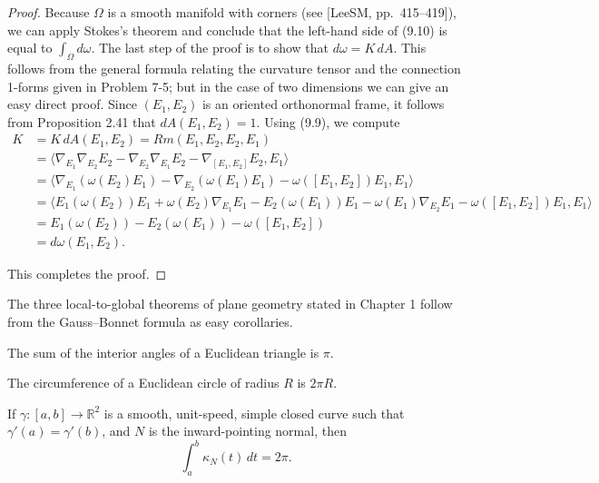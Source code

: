 \begin{proof}
Because $\Omega$ is a smooth manifold with corners (see [LeeSM, pp.~415--419]), we can apply Stokes's theorem and conclude that the left-hand side of (9.10) is equal to $\int_\Omega d\omega$. The last step of the proof is to show that $d\omega = K\, dA$. This follows from the general formula relating the curvature tensor and the connection 1-forms given in Problem 7-5; but in the case of two dimensions we can give an easy direct proof. Since $(E_1, E_2)$ is an oriented orthonormal frame, it follows from Proposition 2.41 that $dA(E_1, E_2) = 1$. Using (9.9), we compute
\begin{align*}
K &= K\, dA(E_1, E_2) = Rm(E_1, E_2, E_2, E_1) \\
&= \langle \nabla_{E_1} \nabla_{E_2} E_2 - \nabla_{E_2} \nabla_{E_1} E_2 - \nabla_{[E_1,E_2]} E_2, E_1 \rangle \\
&= \langle \nabla_{E_1} (\omega(E_2)E_1) - \nabla_{E_2} (\omega(E_1)E_1) - \omega([E_1, E_2])E_1, E_1 \rangle \\
&= \langle E_1(\omega(E_2))E_1 + \omega(E_2)\nabla_{E_1} E_1 - E_2(\omega(E_1))E_1 - \omega(E_1)\nabla_{E_2} E_1 - \omega([E_1, E_2])E_1, E_1 \rangle \\
&= E_1(\omega(E_2)) - E_2(\omega(E_1)) - \omega([E_1, E_2]) \\
&= d\omega(E_1, E_2).
\end{align*}

This completes the proof.
\end{proof}

The three local-to-global theorems of plane geometry stated in Chapter 1 follow from the Gauss--Bonnet formula as easy corollaries.

\begin{corollary}
\label{cor:angle-sum-theorem}
The sum of the interior angles of a Euclidean triangle is $\pi$.
\end{corollary}

\begin{corollary}
\label{cor:circumference-theorem}
The circumference of a Euclidean circle of radius $R$ is $2\pi R$.
\end{corollary}


\begin{corollary}
\label{cor:total-curvature-theorem}
If $\gamma : [a,b] \to \mathbb{R}^2$ is a smooth, unit-speed, simple closed curve such that $\gamma'(a) = \gamma'(b)$, and $N$ is the inward-pointing normal, then
\[
\int_a^b \kappa_N(t) \, dt = 2\pi.
\]
\end{corollary}

